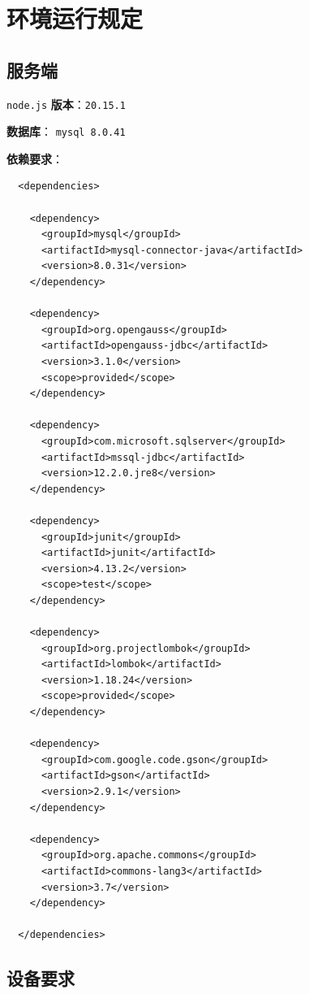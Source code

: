 \documentclass[12pt,a4paper,UTF8]{article}
\begin{document}
\section{环境运行规定}

\subsection{服务端}

\verb|node.js| \textbf{版本}：\verb|20.15.1|

\textbf{数据库}： \verb|mysql 8.0.41|

\textbf{依赖要求}： 

\vspace{0.25cm} %

\begin{lstlisting}
  <dependencies>

    <dependency>
      <groupId>mysql</groupId>
      <artifactId>mysql-connector-java</artifactId>
      <version>8.0.31</version>
    </dependency>

    <dependency>
      <groupId>org.opengauss</groupId>
      <artifactId>opengauss-jdbc</artifactId>
      <version>3.1.0</version>
      <scope>provided</scope>
    </dependency>

    <dependency>
      <groupId>com.microsoft.sqlserver</groupId>
      <artifactId>mssql-jdbc</artifactId>
      <version>12.2.0.jre8</version>
    </dependency>

    <dependency>
      <groupId>junit</groupId>
      <artifactId>junit</artifactId>
      <version>4.13.2</version>
      <scope>test</scope>
    </dependency>

    <dependency>
      <groupId>org.projectlombok</groupId>
      <artifactId>lombok</artifactId>
      <version>1.18.24</version>
      <scope>provided</scope>
    </dependency>

    <dependency>
      <groupId>com.google.code.gson</groupId>
      <artifactId>gson</artifactId>
      <version>2.9.1</version>
    </dependency>

    <dependency>
      <groupId>org.apache.commons</groupId>
      <artifactId>commons-lang3</artifactId>
      <version>3.7</version>
    </dependency>

  </dependencies>
\end{lstlisting}

\subsection{设备要求}
\end{document}
